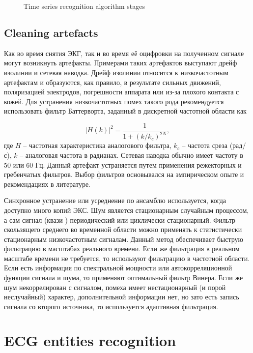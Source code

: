 \documentclass[runningheads]{AIIT}
\begin{document}
\begin{figure}[htb]
  \centering

  \caption{Time series recognition algorithm stages}
  \label{fig:leads-ex}
\end{figure}

\subsection{Cleaning artefacts}
\label{sec:cleaning-artefacts}

Как во время снятия ЭКГ, так и во время её оцифровки на полученном сигнале могут возникнуть артефакты. Примерами таких артефактов выступают дрейф изолинии и сетевая наводка. Дрейф изолинии относится к низкочастотным артефактам и образуются, как правило, в результате сильных движений, поляризацией электродов, погрешности аппарата или из-за плохого контакта с кожей. Для устранения низкочастотных помех такого рода рекомендуется использовать фильтр Баттерворта, заданный в дискретной частотной области как

$$
|H(k)|^2=\frac{1}{1+(k/k_c)^{2N}},
$$
где $H$ – частотная характеристика аналогового фильтра, $k_c$  – частота среза (рад/с), $k$ – аналоговая частота в радианах.
Сетевая наводка обычно имеет частоту в 50 или 60 Гц. Данный артефакт устраняется путем применения режекторных и гребенчатых фильтров.
Выбор фильтров основывался на эмпирическом опыте и рекомендациях в литературе.

Синхронное устранение или усреднение по ансамблю используется, когда доступно много копий ЭКС. Шум является стационарным случайным процессом, а сам сигнал (квази-) периодический или циклически-стационарный. Фильтр скользящего среднего во временной области можно применять к статистически стационарным низкочастотным сигналам. Данный метод обеспечивает быструю фильтрацию в масштабах реального времени. Если же фильтрация в реальном масштабе времени не требуется, то используют фильтрацию в частотной области. Если есть информация по спектральной мощности или автокорреляционной функции сигнала и шума, то применяют оптимальный фильтр Винера. Если же шум некоррелирован с сигналом, помеха имеет нестационарный (и порой неслучайный) характер, дополнительной информации нет, но зато есть запись сигнала со второго источника, то используется адаптивная фильтрация.

\section{ECG entities recognition}
\label{sec:ecg-etit-recogn}
\end{document}
